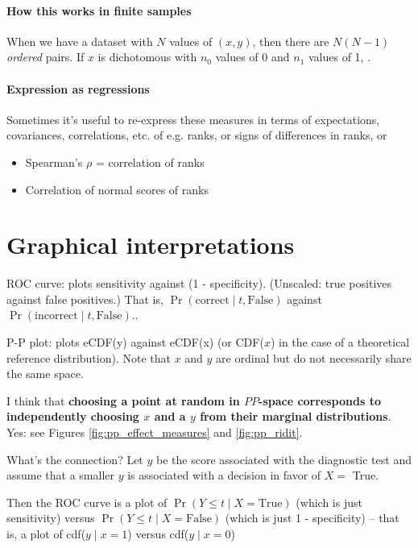 \documentclass[
  11pt,
  fleqn
]{article}
\begin{document}
\paragraph{How this works in finite samples} When we have a dataset with $N$
values of $(x, y)$, then there are $N(N-1)$ \emph{ordered} pairs. If $x$ is
dichotomous with $n_0$ values of 0 and $n_1$ values of 1, .

\paragraph{Expression as regressions} Sometimes it's useful to
re-express these measures in terms of expectations, covariances,
correlations, etc. of e.g. ranks, or signs of differences in ranks, or

\begin{itemize}
  \item Spearman's $\rho$ = correlation of ranks
  \item Correlation of normal scores of ranks
\end{itemize}

\section{Graphical interpretations}

ROC curve: plots sensitivity against (1 - specificity). (Unscaled:
true positives against false positives.) That is, $\Pr(\text{correct}
\mid t, \text{False})$ against $\Pr(\text{incorrect} \mid t, \text{False})$..

P-P plot: plots eCDF(y) against eCDF(x) (or CDF($x$) in the case of a
theoretical reference distribution). Note that $x$ and $y$ are
ordinal but do not necessarily share the same space.

I think that \textbf{choosing a point at random in $PP$-space
  corresponds to independently choosing $x$ and a $y$ from their
marginal distributions}. Yes: see Figures
\ref{fig:pp_effect_measures} and \ref{fig:pp_ridit}.

What's the connection? Let $y$ be the score associated with the
diagnostic test and assume that a smaller $y$ is associated with a
decision in favor of $X =$ True.

Then the ROC curve is a plot of $\Pr(Y \leq t \mid X = \text{True})$
(which is just sensitivity)
versus $\Pr(Y \leq t \mid X = \text{False})$ (which is just 1 -
specificity) -- that is, a plot of cdf($y \mid x = 1$) versus cdf($y
\mid x = 0$)
\end{document}
